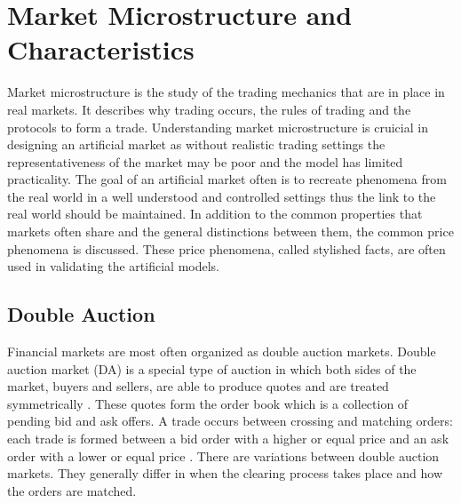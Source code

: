 \section{Market Microstructure and Characteristics}

Market microstructure is the study of the trading mechanics that are in place 
in real markets. It describes why trading occurs, the rules of trading 
and the protocols to form a trade. \citep[p. 3-4]{Has07}
Understanding market microstructure is cruicial in designing an artificial market
as without realistic trading settings the representativeness of the market may be
poor and the model has limited practicality. The goal of an artificial market often
is to recreate phenomena from the real world in a well understood and controlled 
settings thus the link to the real world should be maintained. In addition to the
common properties that markets often share and the general distinctions between
them, the common price phenomena is discussed. These price phenomena, called
stylished facts, are often used in validating the artificial models.


\subsection{Double Auction}

Financial markets are most often organized as double auction markets.
Double auction market (DA) is a special type of auction in which both sides 
of the market, buyers and sellers, are able to 
produce quotes and are treated symmetrically \citep*{Kle99}. These quotes form the order book 
which is a collection of pending bid and ask offers. A trade 
occurs between crossing and matching orders: each trade is formed between 
a bid order with a higher or equal price and an ask order with a lower 
or equal price \citep*{Ben12}. There are variations between double auction markets.
They generally differ in when the clearing process takes place 
and how the orders are matched. 


